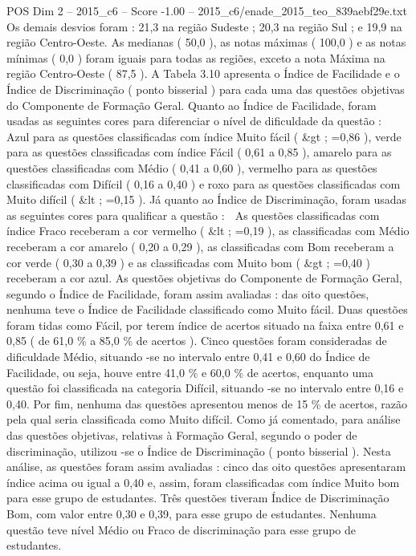 \begin{textsample}{POS Dim 2 – 2015\_c6 – Score -1.00 – 2015\_c6/enade\_2015\_teo\_839aebf29e.txt}
Os demais desvios foram : 21,3 na região Sudeste ; 20,3 na região Sul ; e 19,9 na região Centro-Oeste.
As medianas ( 50,0 ), as notas máximas ( 100,0 ) e as notas mínimas ( 0,0 ) foram iguais para todas as regiões, exceto a nota Máxima na região Centro-Oeste ( 87,5 ).
A Tabela 3.10 apresenta o Índice de Facilidade e o Índice de Discriminação ( ponto bisserial ) para cada uma das questões objetivas do Componente de Formação Geral.
Quanto ao Índice de Facilidade, foram usadas as seguintes cores para diferenciar o nível de dificuldade da questão :  Azul para as questões classificadas com índice Muito fácil ( \&gt ; =0,86 ), verde para as questões classificadas com índice Fácil ( 0,61 a 0,85 ), amarelo para as questões classificadas com Médio ( 0,41 a 0,60 ), vermelho para as questões classificadas com Difícil ( 0,16 a 0,40 ) e roxo para as questões classificadas com Muito difícil ( \&lt ; =0,15 ).
Já quanto ao Índice de Discriminação, foram usadas as seguintes cores para qualificar a questão :  As questões classificadas com índice Fraco receberam a cor vermelho ( \&lt ; =0,19 ), as classificadas com Médio receberam a cor amarelo ( 0,20 a 0,29 ), as classificadas com Bom receberam a cor verde ( 0,30 a 0,39 ) e as classificadas com Muito bom ( \&gt ; =0,40 ) receberam a cor azul.
As questões objetivas do Componente de Formação Geral, segundo o Índice de Facilidade, foram assim avaliadas : das oito questões, nenhuma teve o Índice de Facilidade classificado como Muito fácil.
Duas questões foram tidas como Fácil, por terem índice de acertos situado na faixa entre 0,61 e 0,85 ( de 61,0 \% a 85,0 \% de acertos ).
Cinco questões foram consideradas de dificuldade Médio, situando -se no intervalo entre 0,41 e 0,60 do Índice de Facilidade, ou seja, houve entre 41,0 \% e 60,0 \% de acertos, enquanto uma questão foi classificada na categoria Difícil, situando -se no intervalo entre 0,16 e 0,40.
Por fim, nenhuma das questões apresentou menos de 15 \% de acertos, razão pela qual seria classificada como Muito difícil.
Como já comentado, para análise das questões objetivas, relativas à Formação Geral, segundo o poder de discriminação, utilizou -se o Índice de Discriminação ( ponto bisserial ).
Nesta análise, as questões foram assim avaliadas : cinco das oito questões apresentaram índice acima ou igual a 0,40 e, assim, foram classificadas com índice Muito bom para esse grupo de estudantes.
Três questões tiveram Índice de Discriminação Bom, com valor entre 0,30 e 0,39, para esse grupo de estudantes.
Nenhuma questão teve nível Médio ou Fraco de discriminação para esse grupo de estudantes.

\end{textsample}

